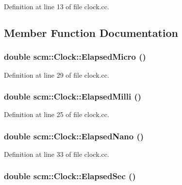 Definition at line 13 of file clock.cc.



\subsection{Member Function Documentation}
\hypertarget{classscm_1_1_clock_a4aa1a9c3a67a29ea36df1d96c4e704a8}{
\subsubsection[{ElapsedMicro}]{\setlength{\rightskip}{0pt plus 5cm}double scm::Clock::ElapsedMicro ()}}
\label{classscm_1_1_clock_a4aa1a9c3a67a29ea36df1d96c4e704a8}


Definition at line 29 of file clock.cc.

\hypertarget{classscm_1_1_clock_a84f0eb2cc75d6354da139aaf23affe84}{
\subsubsection[{ElapsedMilli}]{\setlength{\rightskip}{0pt plus 5cm}double scm::Clock::ElapsedMilli ()}}
\label{classscm_1_1_clock_a84f0eb2cc75d6354da139aaf23affe84}


Definition at line 25 of file clock.cc.

\hypertarget{classscm_1_1_clock_a088b92be330ad4be554ad0af3f60423d}{
\subsubsection[{ElapsedNano}]{\setlength{\rightskip}{0pt plus 5cm}double scm::Clock::ElapsedNano ()}}
\label{classscm_1_1_clock_a088b92be330ad4be554ad0af3f60423d}


Definition at line 33 of file clock.cc.

\hypertarget{classscm_1_1_clock_a69a85c72b329ac5840f0dcea13167c70}{
\subsubsection[{ElapsedSec}]{\setlength{\rightskip}{0pt plus 5cm}double scm::Clock::ElapsedSec ()}}
\label{classscm_1_1_clock_a69a85c72b329ac5840f0dcea13167c70}


